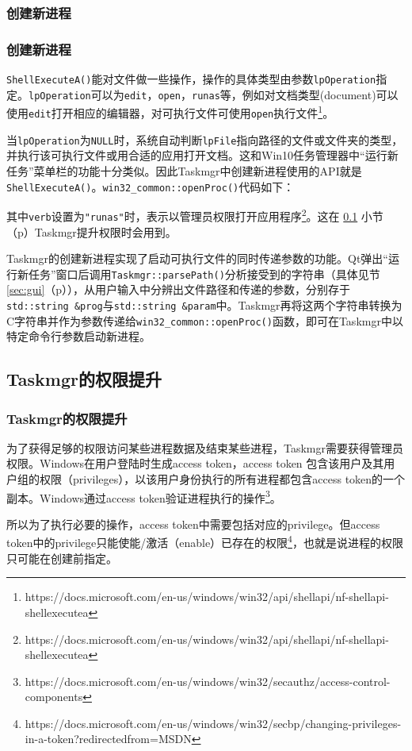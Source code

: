 \documentclass{beamer}
\newcommand\code[1]{\texttt{#1}}
\newcommand\myref[1]{\ref{#1}（p\pageref{#1}）}
\begin{document}
\subsubsection{创建新进程}
\begin{frame}
    \frametitle{创建新进程}
    \code{ShellExecuteA()}能对文件做一些操作，操作的具体类型由参数\code{lpOperation}指定。\code{lpOperation}可以为\code{edit}，\code{open}，\code{runas}等，例如对文档类型(document)可以使用\code{edit}打开相应的编辑器，对可执行文件可使用\code{open}执行文件\footnote{https://docs.microsoft.com/en-us/windows/win32/api/shellapi/nf-shellapi-shellexecutea}。

当\code{lpOperation}为\code{NULL}时，系统自动判断\code{lpFile}指向路径的文件或文件夹的类型，并执行该可执行文件或用合适的应用打开文档。这和Win10任务管理器中``运行新任务''菜单栏的功能十分类似。因此Taskmgr中创建新进程使用的API就是\code{ShellExecuteA()}。\code{win32\_common::openProc()}代码如下：
\end{frame}

\begin{frame}
    
{
    \ttfamily
    
}
\end{frame}

\begin{frame}
其中\code{verb}设置为\code{"runas"}时，表示以管理员权限打开应用程序\footnote{https://docs.microsoft.com/en-us/windows/win32/api/shellapi/nf-shellapi-shellexecutea}。这在 \ref{elevatepriv} 小节（p\pageref{elevatepriv}）Taskmgr提升权限时会用到。
\end{frame}

\begin{frame}
    Taskmgr的创建新进程实现了启动可执行文件的同时传递参数的功能。Qt弹出``运行新任务''窗口后调用\code{Taskmgr::parsePath()}分析接受到的字符串（具体见节\myref{sec:gui}），从用户输入中分辨出文件路径和传递的参数，分别存于\code{std::string \&prog}与\code{std::string \&param}中。Taskmgr再将这两个字符串转换为C字符串并作为参数传递给\code{win32\_common::openProc()}函数，即可在Taskmgr中以特定命令行参数启动新进程。
\end{frame}

\subsection{Taskmgr的权限提升}
\label{elevatepriv}
\begin{frame}
    \frametitle{Taskmgr的权限提升}
    为了获得足够的权限访问某些进程数据及结束某些进程，Taskmgr需要获得管理员权限。Windows在用户登陆时生成access token，access token 包含该用户及其用户组的权限（privileges），以该用户身份执行的所有进程都包含access token的一个副本。Windows通过access token验证进程执行的操作\footnote{https://docs.microsoft.com/en-us/windows/win32/secauthz/access-control-components}。

所以为了执行必要的操作，access token中需要包括对应的privilege。但access token中的privilege只能使能/激活（enable）已存在的权限\footnote{https://docs.microsoft.com/en-us/windows/win32/secbp/changing-privileges-in-a-token?redirectedfrom=MSDN}，也就是说进程的权限只可能在创建前指定。
\end{frame}
\end{document}

